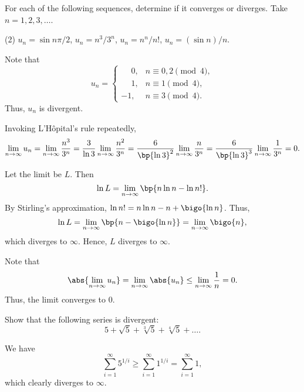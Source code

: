 \begin{problem}
    For each of the following sequences, determine if it converges or diverges. Take $n = 1, 2, 3, \dots$.

    \begin{tasks}(2)
        \task $u_n = \sin{n\pi/2}$,
        \task $u_n = n^3/3^n$,
        \task $u_n = n^n / n!$,
        \task $u_n = (\sin n)/n$.
    \end{tasks}
\end{problem}
\begin{solution}
    \begin{ppart}
        Note that \[u_n = \begin{cases}
            \phantom{-}0, & n \equiv 0, 2 \pmod{4},\\
            \phantom{-}1, & n \equiv 1 \pmod{4},\\
            -1, & n \equiv 3 \pmod{4}.
        \end{cases}\] Thus, $u_n$ is divergent.
    \end{ppart}
    \begin{ppart}
        Invoking L'H\^{o}pital's rule repeatedly, \[\lim_{n \to \infty} u_n = \lim_{n \to \infty} \frac{n^3}{3^n} = \frac{3}{\ln 3} \lim_{n \to \infty} \frac{n^2}{3^n} = \frac{6}{\bp{\ln 3}^2} \lim_{n \to \infty} \frac{n}{3^n} = \frac{6}{\bp{\ln 3}^3} \lim_{n \to \infty} \frac1{3^n} = 0.\]
    \end{ppart}
    \begin{ppart}
        Let the limit be $L$. Then \[\ln L = \lim_{n \to \infty} \bp{n \ln n - \ln n!}.\] By Stirling's approximation, $\ln n! = n\ln n - n + \bigo{\ln n}$. Thus, \[\ln L = \lim_{n \to \infty} \bp{n - \bigo{\ln n}} = \lim_{n \to \infty} \bigo{n},\] which diverges to $\infty$. Hence, $L$ diverges to $\infty$.
    \end{ppart}
    \begin{ppart}
        Note that \[\abs{\lim_{n \to \infty} u_n} = \lim_{n \to \infty} \abs{u_n} \leq \lim_{n \to \infty} \frac{1}{n} = 0.\] Thus, the limit converges to 0.
    \end{ppart}
\end{solution}

\begin{problem}
    Show that the following series is divergent: \[5 + \sqrt5 + \sqrt[3]{5} + \sqrt[4]{5} + \dots.\]
\end{problem}
\begin{solution}
    We have \[\sum_{i = 1}^\infty 5^{1/i} \geq \sum_{i = 1}^\infty 1^{1/i} = \sum_{i = 1}^\infty 1,\] which clearly diverges to $\infty$.
\end{solution}

